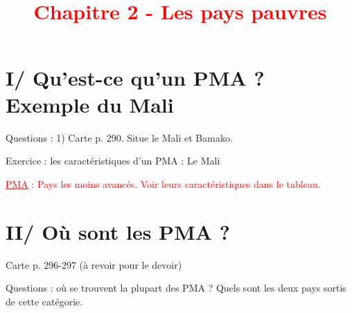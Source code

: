 \documentclass{beamer}
\title{{\textcolor{red}{ %
      \\Chapitre 2 - Les pays pauvres}}}
\begin{document}
 
 
 
 \section{I/ Qu'est-ce qu'un PMA ? Exemple du Mali}

Questions : 
1) Carte p. 290. Situe le Mali et Bamako.

Exercice : les caractéristiques d'un PMA : Le Mali

\textcolor{red}{\underline{PMA} : Pays les moins avancés. Voir leurs caractéristiques dans le tableau.}

\section{II/ Où sont les PMA ?}
Carte p. 296-297 (à revoir pour le devoir)

Questions : où se trouvent la plupart des PMA ? Quels sont les deux pays sortis de cette catégorie.


  
\end{document}
